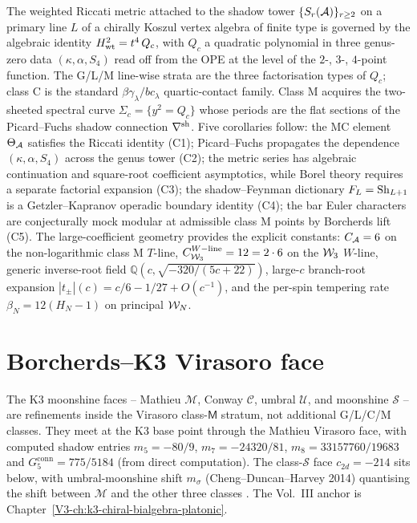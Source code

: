 \begin{summary}
\label{sum:chapter-one-paragraph}
The weighted Riccati metric attached to the shadow tower
$\{S_r(\mathcal{A})\}_{r \ge 2}$ on a primary line $L$ of a chirally Koszul
vertex algebra of finite type is governed by the algebraic identity
$H_{\rm wt}^{2} = t^{4}\,Q_c$, with $Q_c$ a quadratic polynomial in
three genus-zero data $(\kappa, \alpha, S_4)$ read off from the OPE
at the level of the $2$-, $3$-, $4$-point function. The G/L/M
line-wise strata are the three factorisation types of $Q_c$; class C
is the standard $\beta\gamma_\lambda/bc_\lambda$ quartic-contact
family. Class M acquires the two-sheeted spectral curve
$\Sigma_c = \{y^{2} = Q_c\}$ whose periods are the flat sections of
the Picard--Fuchs shadow connection $\nabla^{\rm sh}$. Five
corollaries follow: the MC element $\Theta_{\mathcal{A}}$ satisfies the
Riccati identity (C1); Picard--Fuchs propagates the dependence
$(\kappa, \alpha, S_4)$ across the genus tower (C2); the metric
series has algebraic continuation and square-root coefficient
asymptotics, while Borel theory requires a separate factorial
expansion (C3); the
shadow--Feynman dictionary $F_L = \mathrm{Sh}_{L+1}$ is a Getzler--Kapranov
operadic boundary identity (C4); the bar Euler characters are
conjecturally mock modular at admissible class M points by Borcherds
lift (C5). The large-coefficient geometry provides the explicit
constants:
$C_{\mathcal{A}} = 6$ on the non-logarithmic class M $T$-line,
$C^{W{\rm-line}}_{\mathcal{W}_3} = 12 = 2 \cdot 6$ on the $\mathcal{W}_3$ $W$-line,
generic inverse-root field
$\mathbb Q(c,\sqrt{-320/(5c+22)})$, large-$c$ branch-root expansion
$|t_\pm|(c)=c/6-1/27+O(c^{-1})$, and the per-spin tempering rate
$\beta_N = 12 (H_N - 1)$ on principal $\mathcal{W}_N$.
\end{summary}

\section{Borcherds--K3 Virasoro face}
\label{sec:stqp-supplement}

\begin{remark}
\label{rem:stqp-1}
The K3 moonshine faces -- Mathieu $\mathcal M$, Conway $\mathcal C$,
umbral $\mathcal U$, and moonshine $\mathcal S$ -- are refinements
inside the Virasoro class-$\mathsf M$ stratum, not additional
G/L/C/M classes. They meet at the K3 base point through the Mathieu
Virasoro face, with computed shadow entries
$m_5 = -80/9$, $m_7 = -24320/81$, $m_8 = 33157760/19683$
and $G_5^{\mathrm{conn}} = 775/5184$ (from direct computation). The
class-$\mathcal S$ face $c_{2d} = -214$ sits below, with umbral-moonshine
shift $m_\sigma$ (Cheng--Duncan--Harvey 2014) quantising the shift
between $\mathcal M$ and the other three classes
\cite{ChengDuncanHarvey2014,EguchiOoguriTachikawa2010}. The Vol.~III
anchor is Chapter~\ref{V3-ch:k3-chiral-bialgebra-platonic}.
\end{remark}

